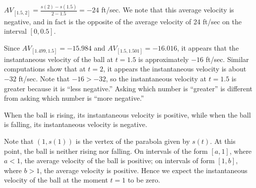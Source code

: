 \begin{activitySolution}
\ba
	\item $AV_{[1.5,2]} = \frac{s(2)-s(1.5)}{2-1.5} = -24$ ft/sec.  We note that this average velocity is negative, and in fact is the opposite of the average velocity of 24 ft/sec on the interval $[0,0.5]$.
	\item Since $AV_{[1.499,1.5]} = -15.984$ and $AV_{[1.5, 1.501]} = -16.016$, it appears that the instantaneous velocity of the ball at $t = 1.5$ is approximately $-16$ ft/sec.  Similar computations show that at $t = 2$, it appears the instantaneous velocity is about $-32$ ft/sec.  Note that $-16>-32$, so the instantaneous velocity at $t = 1.5$ is greater because it is ``less negative.'' Asking which number is ``greater'' is different from asking which number is ``more negative.''
	\item When the ball is rising, its instantaneous velocity is positive, while when the ball is falling, its instantaneous velocity is negative.
	\item Note that $(1,s(1))$ is the vertex of the parabola given by $s(t)$.  At this point, the ball is neither rising nor falling.  On intervals of the form $[a,1]$, where $a < 1$, the average velocity of the ball is positive; on intervals of form $[1,b]$, where $b > 1$, the average velocity is positive.  Hence we expect the instantaneous velocity of the ball at the moment $t = 1$ to be zero.
\ea
\end{activitySolution}
\aftera
